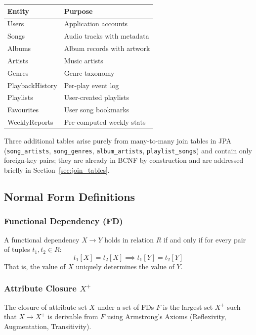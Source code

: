 \documentclass[12pt, a4paper]{article}
\newcommand{\attr}[1]{\texttt{#1}}
\begin{document}
\vspace{0.5em}
\begin{tabular}{@{}L{4cm}L{9cm}@{}}
    \toprule
    \textbf{Entity} & \textbf{Purpose} \\
    \midrule
    Users           & Application accounts \\
    Songs           & Audio tracks with metadata \\
    Albums          & Album records with artwork \\
    Artists         & Music artists \\
    Genres          & Genre taxonomy \\
    PlaybackHistory & Per-play event log \\
    Playlists       & User-created playlists \\
    Favourites      & User song bookmarks \\
    WeeklyReports   & Pre-computed weekly stats \\
    \bottomrule
\end{tabular}
\vspace{0.5em}

Three additional tables arise purely from many-to-many join tables in JPA
(\attr{song\_artists}, \attr{song\_genres}, \attr{album\_artists}, \attr{playlist\_songs})
and contain only foreign-key pairs; they are already in BCNF by construction and are
addressed briefly in Section~\ref{sec:join_tables}.

\subsection{Normal Form Definitions}

\subsubsection{Functional Dependency (FD)}
A functional dependency $X \to Y$ holds in relation $R$ if and only if for every pair of
tuples $t_1, t_2 \in R$:
\[
    t_1[X] = t_2[X] \implies t_1[Y] = t_2[Y]
\]
That is, the value of $X$ uniquely determines the value of $Y$.

\subsubsection{Attribute Closure $X^+$}
The closure of attribute set $X$ under a set of FDs $F$ is the largest set $X^+$ such
that $X \to X^+$ is derivable from $F$ using Armstrong's Axioms (Reflexivity,
Augmentation, Transitivity).
\end{document}
